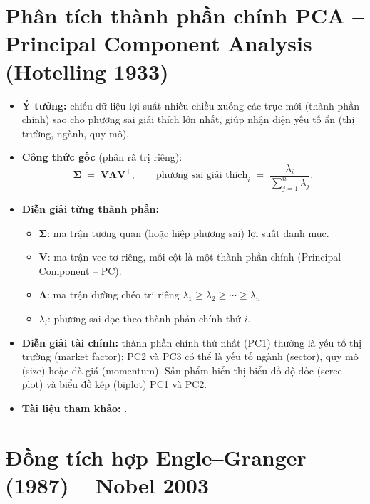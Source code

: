 \documentclass[12pt,a4paper,openany,oneside]{report}
\numberwithin{equation}{chapter}
\begin{document}
\section{Phân tích thành phần chính PCA -- Principal Component Analysis (Hotelling 1933)}

\begin{itemize}[leftmargin=18pt,topsep=2pt,itemsep=4pt]
  \item \textbf{Ý tưởng:} chiếu dữ liệu lợi suất nhiều chiều xuống các
        trục mới (thành phần chính) sao cho phương sai giải thích lớn
        nhất, giúp nhận diện yếu tố ẩn (thị trường, ngành, quy mô).
  \item \textbf{Công thức gốc} (phân rã trị riêng):
        \begin{equation}
          \boldsymbol{\Sigma} \;=\; \mathbf{V}\boldsymbol{\Lambda}\mathbf{V}^{\!\top},
          \qquad
          \text{phương sai giải thích}_i \;=\;
          \dfrac{\lambda_i}{\sum_{j=1}^{n}\lambda_j}.
          \label{eq:pca}
        \end{equation}
  \item \textbf{Diễn giải từng thành phần:}
        \begin{itemize}[leftmargin=14pt,topsep=2pt,itemsep=1pt]
          \item $\boldsymbol{\Sigma}$: ma trận tương quan (hoặc hiệp phương
                sai) lợi suất danh mục.
          \item $\mathbf{V}$: ma trận vec-tơ riêng, mỗi cột là một thành
                phần chính (Principal Component -- PC).
          \item $\boldsymbol{\Lambda}$: ma trận đường chéo trị riêng
                $\lambda_1 \ge \lambda_2 \ge \cdots \ge \lambda_n$.
          \item $\lambda_i$: phương sai dọc theo thành phần chính thứ $i$.
        \end{itemize}
  \item \textbf{Diễn giải tài chính:} thành phần chính thứ nhất (PC1)
        thường là yếu tố thị trường (market factor); PC2 và PC3 có thể
        là yếu tố ngành (sector), quy mô (size) hoặc đà giá (momentum).
        Sản phẩm hiển thị biểu đồ độ dốc (scree plot) và biểu đồ kép
        (biplot) PC1 và PC2.
  \item \textbf{Tài liệu tham khảo:} \citet{Hotelling1933}.
\end{itemize}

\section{Đồng tích hợp Engle--Granger (1987) -- Nobel 2003}
\end{document}
